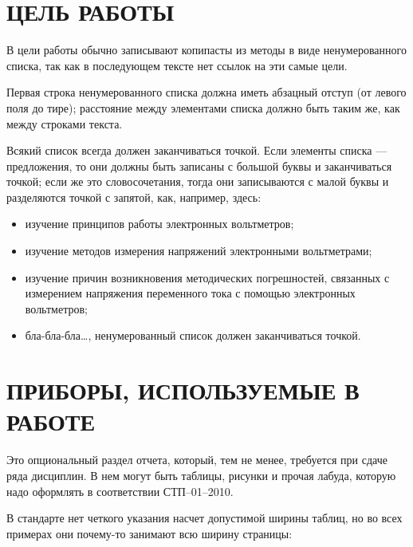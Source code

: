 \documentclass[a4paper,hidelinks,14pt]{extarticle}
\begin{document}

\section{ЦЕЛЬ РАБОТЫ}

В цели работы обычно записывают копипасты из методы в виде ненумерованного списка,
так как в последующем тексте нет ссылок на эти самые цели.

Первая строка ненумерованного списка должна иметь абзацный отступ (от левого поля до тире); 
расстояние между элементами списка должно быть таким же, как между строками текста.

Всякий список всегда должен заканчиваться точкой. Если элементы списка --- 
предложения, то они должны быть записаны с большой буквы и заканчиваться точкой; если же это 
словосочетания, тогда они записываются с малой буквы и разделяются точкой с запятой, как, например, здесь: 

\begin{itemize} 
	\item изучение принципов работы электронных вольтметров;
	\item изучение методов измерения напряжений электронными вольтметрами;
	\item изучение причин возникновения методических погрешностей, связанных с измерением напряжения переменного тока с помощью электронных вольтметров;
	\item бла-бла-бла\dots, ненумерованный список должен заканчиваться точкой.
\end{itemize}

\newpage

\section{ПРИБОРЫ, ИСПОЛЬЗУЕМЫЕ В РАБОТЕ}

Это опциональный раздел отчета, который, тем не менее, требуется при сдаче ряда дисциплин.
В нем могут быть таблицы, рисунки и прочая лабуда, которую надо оформлять в соответствии СТП–01–2010.

В стандарте нет четкого указания насчет допустимой ширины таблиц, но во всех примерах они почему-то 
занимают всю ширину страницы:
\end{document}
